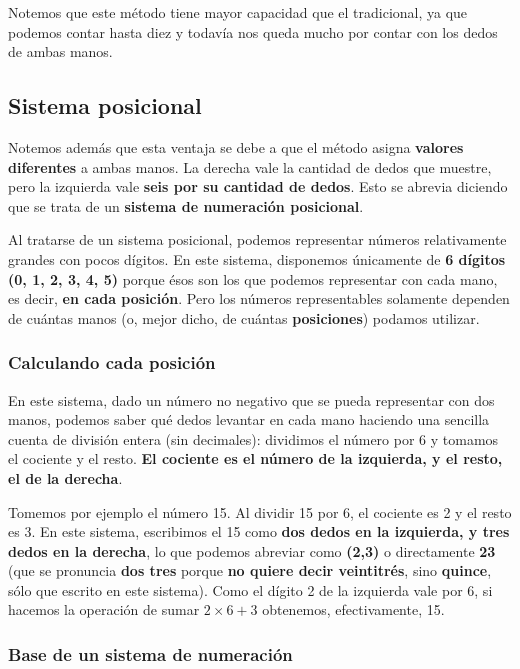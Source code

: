 \documentclass[spanish,A4,]{article}
\begin{document}
Notemos que este método tiene mayor capacidad que el tradicional, ya que
podemos contar hasta diez y todavía nos queda mucho por contar con los
dedos de ambas manos.

\subsection{Sistema posicional}\label{sistema-posicional}

Notemos además que esta ventaja se debe a que el método asigna
\textbf{valores diferentes} a ambas manos. La derecha vale la cantidad
de dedos que muestre, pero la izquierda vale \textbf{seis por su
cantidad de dedos}. Esto se abrevia diciendo que se trata de un
\textbf{sistema de numeración posicional}.

Al tratarse de un sistema posicional, podemos representar números
relativamente grandes con pocos dígitos. En este sistema, disponemos
únicamente de \textbf{6 dígitos (0, 1, 2, 3, 4, 5)} porque ésos son los
que podemos representar con cada mano, es decir, \textbf{en cada
posición}. Pero los números representables solamente dependen de cuántas
manos (o, mejor dicho, de cuántas \textbf{posiciones}) podamos utilizar.

\subsubsection{Calculando cada
posición}\label{calculando-cada-posiciuxf3n}

En este sistema, dado un número no negativo que se pueda representar con
dos manos, podemos saber qué dedos levantar en cada mano haciendo una
sencilla cuenta de división entera (sin decimales): dividimos el número
por 6 y tomamos el cociente y el resto. \textbf{El cociente es el número
de la izquierda, y el resto, el de la derecha}.

Tomemos por ejemplo el número 15. Al dividir 15 por 6, el cociente es 2
y el resto es 3. En este sistema, escribimos el 15 como \textbf{dos
dedos en la izquierda, y tres dedos en la derecha}, lo que podemos
abreviar como \textbf{(2,3)} o directamente \textbf{23} (que se
pronuncia \textbf{dos tres} porque \textbf{no quiere decir veintitrés},
sino \textbf{quince}, sólo que escrito en este sistema). Como el dígito
2 de la izquierda vale por 6, si hacemos la operación de sumar
\textbf{$2 \times 6 + 3$} obtenemos, efectivamente, 15.

\subsubsection{Base de un sistema de
numeración}\label{base-de-un-sistema-de-numeraciuxf3n}
\end{document}
